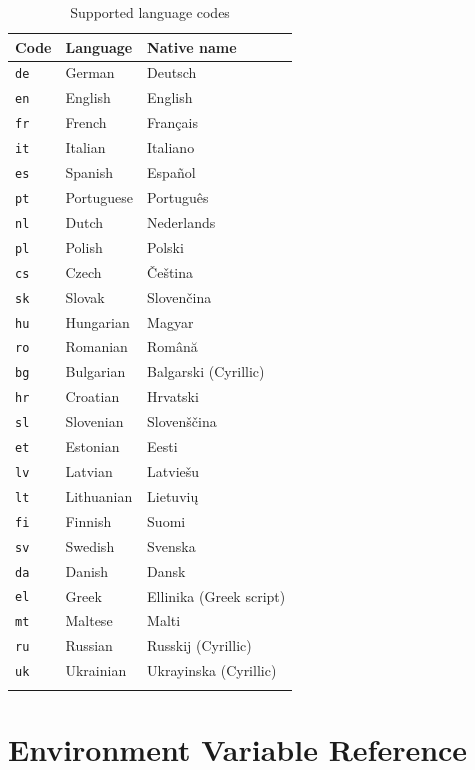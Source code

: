 \documentclass[12pt,a4paper,twoside]{report}
\newcommand{\code}[1]{\texttt{#1}}
\begin{document}
\begin{longtable}{@{}lll@{}}
  \toprule
  \textbf{Code} & \textbf{Language} & \textbf{Native name} \\
  \midrule
  \endhead
  \code{de} & German     & Deutsch \\
  \code{en} & English    & English \\
  \code{fr} & French     & Fran\c{c}ais \\
  \code{it} & Italian    & Italiano \\
  \code{es} & Spanish    & Espa\~{n}ol \\
  \code{pt} & Portuguese & Portugu\^{e}s \\
  \code{nl} & Dutch      & Nederlands \\
  \code{pl} & Polish     & Polski \\
  \code{cs} & Czech      & \v{C}e\v{s}tina \\
  \code{sk} & Slovak     & Sloven\v{c}ina \\
  \code{hu} & Hungarian  & Magyar \\
  \code{ro} & Romanian   & Rom\^{a}n\u{a} \\
  \code{bg} & Bulgarian  & Balgarski (Cyrillic) \\
  \code{hr} & Croatian   & Hrvatski \\
  \code{sl} & Slovenian  & Sloven\v{s}\v{c}ina \\
  \code{et} & Estonian   & Eesti \\
  \code{lv} & Latvian    & Latvie\v{s}u \\
  \code{lt} & Lithuanian & Lietuvi\k{u} \\
  \code{fi} & Finnish    & Suomi \\
  \code{sv} & Swedish    & Svenska \\
  \code{da} & Danish     & Dansk \\
  \code{el} & Greek      & Ellinika (Greek script) \\
  \code{mt} & Maltese    & Malti \\
  \code{ru} & Russian    & Russkij (Cyrillic) \\
  \code{uk} & Ukrainian  & Ukrayinska (Cyrillic) \\
  \bottomrule
  \caption{Supported language codes}
  \label{tab:languages}
\end{longtable}

\chapter{Environment Variable Reference}
\label{app:envvars}
\end{document}
